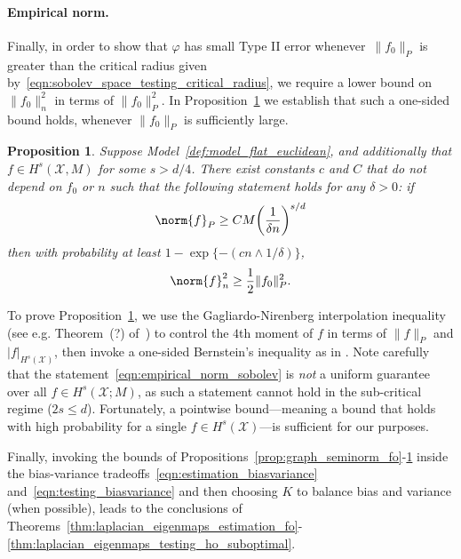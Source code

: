 \documentclass{article}
\newcommand{\1}{\mathbf{1}}
\newcommand{\Xset}{\mathcal{X}}
\newcommand{\mc}[1]{\mathcal{#1}}
\theoremstyle{alden}
\theoremstyle{aldenthm}
\newtheorem{proposition}{Proposition}
\theoremstyle{definition}
\theoremstyle{remark}
\begin{document}
\paragraph{Empirical norm.}
Finally, in order to show that $\varphi$ has small Type II error whenever~$\|f_0\|_P$ is greater than the critical radius given by~\eqref{eqn:sobolev_space_testing_critical_radius}, we require a lower bound on $\|f_0\|_n^2$ in terms of $\|f_0\|_P^2$. In Proposition~\ref{prop:empirical_norm_sobolev} we establish that such a one-sided bound holds, whenever $\|f_0\|_P$ is sufficiently large.
\begin{proposition}
	\label{prop:empirical_norm_sobolev}
	Suppose Model~\ref{def:model_flat_euclidean}, and additionally that $f \in H^s(\Xset,M)$ for some $s > d/4$. There exist constants $c$ and $C$ that do not depend on $f_0$ or $n$ such that the following statement holds for any $\delta > 0$:  if
	\begin{equation}
	\label{eqn:empirical_norm_sobolev_1}
	\norm{f}_{P} \geq C M \biggl(\frac{1}{\delta n}\biggr)^{s/d}
	\end{equation}
	then with probability at least $1 - \exp\{-(cn \wedge 1/\delta)\}$,
	\begin{equation}
	\label{eqn:empirical_norm_sobolev}
	\norm{f}_n^2 \geq \frac{1}{2} \|f_0\|_P^2.
	\end{equation}
\end{proposition}
To prove Proposition~\ref{prop:empirical_norm_sobolev}, we use the Gagliardo-Nirenberg interpolation inequality (see e.g. Theorem~(?) of~\citep{evans10}) to control the $4$th moment of $f$ in terms of $\|f\|_P$ and $|f|_{H^s(\mc{X})}$, then invoke a one-sided Bernstein's inequality as in \cite[Section 14.2]{wainwright2019}. Note carefully that the statement~\eqref{eqn:empirical_norm_sobolev} is \emph{not} a uniform guarantee over all $f \in H^s(\mc{X};M)$, as such a statement cannot hold in the sub-critical regime ($2s \leq d$). Fortunately, a pointwise bound---meaning a bound that holds with high probability for a single $f \in H^s(\mc{X})$---is sufficient for our purposes.

Finally, invoking the bounds of Propositions~\ref{prop:graph_seminorm_fo}-\ref{prop:empirical_norm_sobolev} inside the bias-variance tradeoffs~\eqref{eqn:estimation_biasvariance} and~\eqref{eqn:testing_biasvariance} and then choosing $K$ to balance bias and variance (when possible), leads to the conclusions of Theorems~\ref{thm:laplacian_eigenmaps_estimation_fo}-\ref{thm:laplacian_eigenmaps_testing_ho_suboptimal}.
\end{document}
